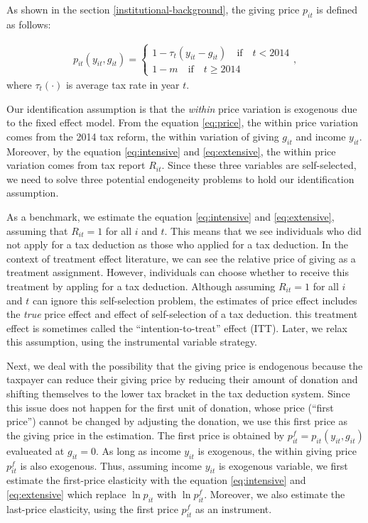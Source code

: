 \documentclass[
  11pt,
  a4paper,
]{article}
\begin{document}
As shown in the section \ref{institutional-background},
the giving price \(p_{it}\) is defined as follows:

\begin{align}
  p_{it}(y_{it}, g_{it}) =
  \begin{cases}
    1 - \tau_t(y_{it} - g_{it})  \quad\text{if}\quad t < 2014  \\
    1 - m \quad\text{if}\quad t \ge 2014
  \end{cases}, \label{eq:price}
\end{align}
where \(\tau_t(\cdot)\) is average tax rate in year \(t\).

Our identification assumption is that the \emph{within} price variation is exogenous due to the fixed effect model.
From the equation \eqref{eq:price},
the within price variation comes from the 2014 tax reform, the within variation of giving \(g_{it}\) and income \(y_{it}\).
Moreover, by the equation \eqref{eq:intensive} and \eqref{eq:extensive},
the within price variation comes from tax report \(R_{it}\).
Since these three variables are self-selected,
we need to solve three potential endogeneity problems to hold our identification assumption.

As a benchmark, we estimate the equation \eqref{eq:intensive} and \eqref{eq:extensive},
assuming that \(R_{it} = 1\) for all \(i\) and \(t\).
This means that we see individuals who did not apply for a tax deduction as those who applied for a tax deduction.
In the context of treatment effect literature,
we can see the relative price of giving as a treatment assignment.
However, individuals can choose whether to receive this treatment by appling for a tax deduction.
Although assuming \(R_{it} = 1\) for all \(i\) and \(t\) can ignore this self-selection problem,
the estimates of price effect includes the \emph{true} price effect and effect of self-selection of a tax deduction.
this treatment effect is sometimes called the ``intention-to-treat'' effect (ITT).
Later, we relax this assumption, using the instrumental variable strategy.

Next, we deal with the possibility that the giving price is endogenous because
the taxpayer can reduce their giving price by reducing their amount of donation
and shifting themselves to the lower tax bracket in the tax deduction system.
Since this issue does not happen for the first unit of donation,
whose price (``first price'') cannot be changed by adjusting the donation,
we use this first price as the giving price in the estimation.
The first price is obtained by \(p^f_{it} = p_{it}(y_{it}, g_{it})\) evalueated at \(g_{it} = 0\).
As long as income \(y_{it}\) is exogenous, the within giving price \(p^f_{it}\) is also exogenous.
Thus, assuming income \(y_{it}\) is exogenous variable,
we first estimate the first-price elasticity with the equation \eqref{eq:intensive} and \eqref{eq:extensive}
which replace \(\ln p_{it}\) with \(\ln p^f_{it}\).
Moreover, we also estimate the last-price elasticity, using the first price \(p^f_{it}\) as an instrument.
\end{document}
